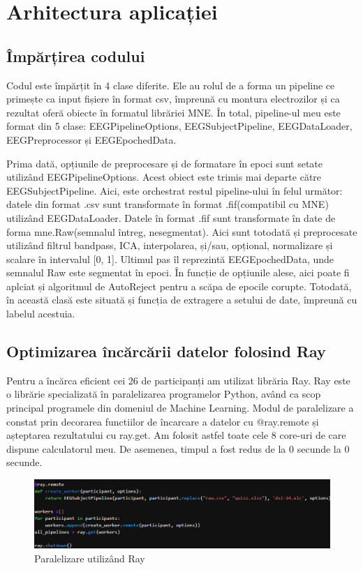\def\timpInainteDeRay{0}
\def\timpDupaRay{0}

\chapter{Arhitectura aplicației}
\section{Împărțirea codului}
Codul este împărțit în 4 clase diferite. Ele au rolul de a forma un pipeline ce primește ca input fișiere în format csv, împreună cu montura electrozilor și ca rezultat oferă obiecte în formatul librăriei MNE.
În total, pipeline-ul meu este format din 5 clase: EEGPipelineOptions, EEGSubjectPipeline, EEGDataLoader, EEGPreprocessor și EEGEpochedData. 

Prima dată, opțiunile de preprocesare și de formatare în epoci sunt setate utilizând EEGPipelineOptions. Acest obiect este trimis mai departe către EEGSubjectPipeline. Aici, este orchestrat restul pipeline-ului în felul următor: datele din format .csv sunt transformate în format .fif(compatibil cu MNE) utilizând EEGDataLoader. Datele în format .fif sunt transformate în date de forma mne.Raw(semnalul întreg, nesegmentat). Aici sunt totodată și preprocesate utilizând filtrul bandpass, ICA, interpolarea, și/sau, opțional, normalizare și scalare în intervalul [0, 1].  Ultimul pas îl reprezintă EEGEpochedData, unde semnalul Raw este segmentat în epoci. În funcție de opțiunile alese, aici poate fi aplciat și algoritmul de AutoReject pentru a scăpa de epocile corupte. Totodată, în această clasă este situată și funcția de extragere a setului de date, împreună cu labelul acestuia.


\section{Optimizarea încărcării datelor folosind Ray}
Pentru a încărca eficient cei 26 de participanți am utilizat librăria Ray\cite{Ray}. Ray este o librărie specializată în paralelizarea programelor Python, având ca scop principal programele din domeniul de Machine Learning. Modul de paralelizare a constat prin decorarea functiilor de încarcare a datelor cu @ray.remote și așteptarea rezultatului cu ray.get. Am folosit astfel toate cele 8 core-uri de care dispune calculatorul meu. De asemenea, timpul a fost redus de la $\timpInainteDeRay$ secunde la $\timpDupaRay$ secunde.

\setlength{\abovecaptionskip}{0pt}
\setlength{\belowcaptionskip}{0pt}
\clearpage
\begin{figure}[!h]
    \centering
    \includegraphics[width=1\linewidth]{images/ray.png}
    \caption{Paralelizare utilizând Ray}
    \label{fig:enter-label}
\end{figure}

